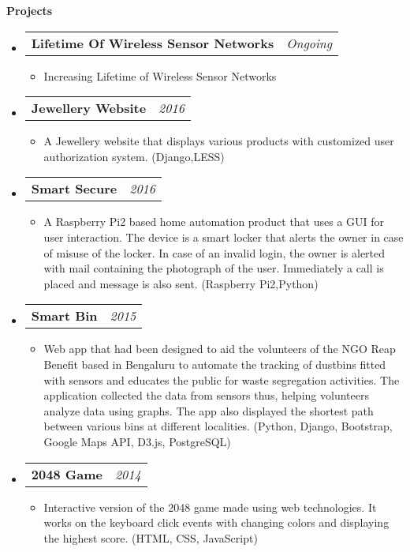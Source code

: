 \documentclass[letterpaper,10pt]{article}
\makeatletter
\newcommand{\resitem}[1]{\item #1 \vspace{-2pt}}
\newcommand{\resheading}[1]{{\large \colorbox{mygrey}{\begin{minipage}{\textwidth}{\textbf{#1 \vphantom{p\^{E}}}}\end{minipage}}}}
\newcommand{\ressubheading}[4]{
\begin{tabular*}{7.0in}{l@{\extracolsep{\fill}}r}
		\textbf{#1} & \textit{#4} \\
\end{tabular*}\vspace{-6pt}}
\makeatother
\begin{document}
\resheading{Projects}
\begin{itemize}

\item
	\ressubheading{Lifetime Of Wireless Sensor Networks}{Self}{Self}{Ongoing}
	\begin{itemize}
		\resitem{Increasing Lifetime of Wireless Sensor Networks}
	\end{itemize}
	
\item
	\ressubheading{Jewellery Website}{Self}{Self}{2016}
	\begin{itemize}
		\resitem{A Jewellery website that displays various products with customized user authorization system.  (Django,LESS)}
	\end{itemize}

\item
	\ressubheading{Smart Secure}{Self}{Self}{2016}
	\begin{itemize}
		\resitem{A Raspberry Pi2 based home automation product that uses a GUI for user interaction. The device is a smart
locker that alerts the owner in case of misuse of the locker. In case of an invalid login, the owner is alerted with
mail containing the photograph of the user. Immediately a call is placed and message is also sent. (Raspberry Pi2,Python)}
	\end{itemize}

\item
	\ressubheading{Smart Bin}{Self}{Self}{2015}
	\begin{itemize}
		\resitem{Web app that had been designed to aid the volunteers of the NGO Reap Benefit based in Bengaluru to
automate the tracking of dustbins fitted with sensors and educates the public for waste segregation activities.
The application collected the data from sensors thus, helping volunteers analyze data using graphs. The app
also displayed the shortest path between various bins at different localities.
(Python, Django, Bootstrap, Google Maps API, D3.js, PostgreSQL)}
	\end{itemize}
	
\item
	\ressubheading{2048 Game}{Self}{Self}{2014}
	\begin{itemize}
		\resitem{Interactive version of the 2048 game made using web technologies. It works on the keyboard click events with
changing colors and displaying the highest score.
(HTML, CSS, JavaScript)}
	\end{itemize}	

\end{itemize}
\end{document}

